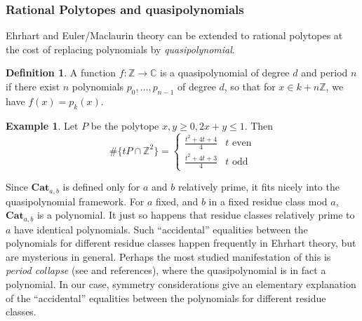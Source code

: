 \documentclass{amsart}[12pt]
\theoremstyle{definition}
\newtheorem{example}[dummy]{Example}
\newtheorem{definition}[dummy]{Definition}
\newcommand{\Z}{\mathbb{Z}}
\newcommand{\C}{\mathbb{C}}
\newcommand{\Cat}{\mathbf{Cat}}
\begin{document}
\subsubsection{Rational Polytopes and quasipolynomials}
Ehrhart and Euler/Maclaurin theory can be extended to rational polytopes at the cost of replacing polynomials by \emph{quasipolynomial}.
\begin{definition}
A function $f:\Z\to\C$ is a quasipolynomial of degree $d$ and period $n$ if there exist $n$ polynomials $p_0,\dots, p_{n-1}$ of degree $d$, so that for $x\in k+n\Z$, we have $f(x)=p_k(x)$.
\end{definition}
\begin{example} Let $P$ be the polytope $x, y\geq 0, 2x+y\leq 1$. Then
$$\#\{tP\cap \Z^2\}=\left\{\begin{array}{rl} \frac{t^2+4t+4}{4} & \text{$t$ even} \\
\frac{t^2+4t+3}{4} & \text{$t$ odd}\end{array}\right.$$
\end{example}
Since $\Cat_{a,b}$ is defined only for $a$ and $b$ relatively prime, it fits nicely into the quasipolynomial framework. For $a$ fixed, and $b$ in a fixed residue class mod $a$, $\Cat_{a,b}$ is a polynomial. It just so happens that residue classes relatively prime to $a$ have identical polynomials. Such ``accidental'' equalities between the polynomials for different residue classes happen frequently in Ehrhart theory, but are mysterious in general. Perhaps the most studied manifestation of this is \emph{period collapse} (see \cite{Haase} and references), where the quasipolynomial is in fact a polynomial. In our case, symmetry considerations give an elementary explanation of the ``accidental'' equalities between the polynomials for different residue classes.
\end{document}
